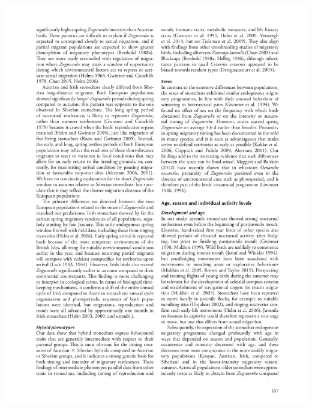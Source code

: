 \documentclass[a4paper, twoside]{templates/ociamthesis}
\begin{document}
\begin{center}\includegraphics[width=1\linewidth]{pdf_chapters/zug/zug_crop_Part13} \end{center}
\end{document}
